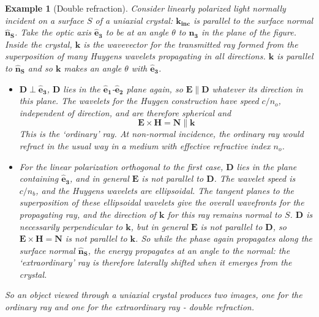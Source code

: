 \documentclass[a4paper]{article}
\newtheorem{eg}{Example}[section]
\theoremstyle{new}
\begin{document}
\begin{eg}[Double refraction]
Consider linearly polarized light normally incident on a surface $S$ of a uniaxial crystal: $\mathbf{k_{inc}}$ is parallel to the surface normal $\mathbf{\hat{n}_S}$. Take the optic axis $\mathbf{\hat{e}_3}$ to be at an angle $\theta$ to $\mathbf{\hat{n}_3}$ in the plane of the figure. Inside the crystal, $\mathbf{k}$ is the wavevector for the transmitted ray formed from the superposition of many Huygens wavelets propagating in all directions. $\mathbf{k}$ is parallel to $\mathbf{\hat{n}_S}$ and so $\mathbf{k}$ makes an angle $\theta$ with $\mathbf{\hat{e}_3}$.
\begin{itemize}
    \item $\mathbf{D}\perp\mathbf{\hat{e}_3}$, $\mathbf{D}$ lies in the $\mathbf{\hat{e}_1}$-$\mathbf{\hat{e}_2}$ plane again, so $\mathbf{E}\parallel\mathbf{D}$ whatever its direction in this plane. The wavelets for the Huygen construction have speed $c/n_o$, independent of direction, and are therefore spherical and
    $$\mathbf{E}\times\mathbf{H}=\mathbf{N}\parallel\mathbf{k}$$
    This is the `ordinary' ray. At non-normal incidence, the ordinary ray would refract in the usual way in a medium with effective refractive index $n_o$.
    \item For the linear polarization orthogonal to the first case, $\mathbf{D}$ lies in the plane containing $\mathbf{\hat{e}_3}$, and in general $\mathbf{E}$ is not parallel to $\mathbf{D}$. The wavelet speed is $c/n_b$, and the Huygens wavelets are ellipsoidal. The tangent planes to the superposition of these ellipsoidal wavelets give the overall wavefronts for the propagating ray, and the direction of $\mathbf{k}$ for this ray remains normal to $S$. $\mathbf{D}$ is necessarily perpendicular to $\mathbf{k}$, but in general $\mathbf{E}$ is not parallel to $\mathbf{D}$, so $\mathbf{E}\times\mathbf{H}=\mathbf{N}$ is not parallel to $\mathbf{k}$. So while the phase again propagates along the surface normal $\mathbf{\hat{n}_S}$, the energy propagates at an angle to the normal: the `extraordinary' ray is therefore laterally shifted when it emerges from the crystal.
\end{itemize}
So an object viewed through a uniaxial crystal produces two images, one for the ordinary ray and one for the extraordinary ray - double refraction.
\end{eg}
\end{document}
